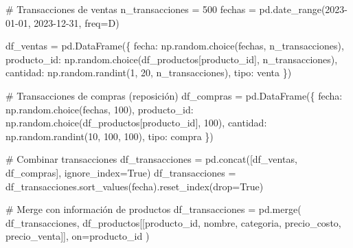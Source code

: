 \documentclass[
  doc,
  floatsintext,
  longtable,
  a4paper,
  nolmodern,
  notxfonts,
  notimes,
  12pt,
  colorlinks=true,linkcolor=blue,citecolor=blue,urlcolor=blue]{apa7}
\newenvironment{Shaded}{\begin{snugshade}}{\end{snugshade}}
\newcommand{\CommentTok}[1]{\textcolor[rgb]{0.37,0.37,0.37}{#1}}
\newcommand{\DecValTok}[1]{\textcolor[rgb]{0.68,0.00,0.00}{#1}}
\newcommand{\NormalTok}[1]{\textcolor[rgb]{0.00,0.23,0.31}{#1}}
\newcommand{\OperatorTok}[1]{\textcolor[rgb]{0.37,0.37,0.37}{#1}}
\newcommand{\StringTok}[1]{\textcolor[rgb]{0.13,0.47,0.30}{#1}}
\newcommand{\VariableTok}[1]{\textcolor[rgb]{0.07,0.07,0.07}{#1}}
\begin{document}
\begin{Shaded}
\begin{Highlighting}[]
\CommentTok{\# Transacciones de ventas}
\NormalTok{n\_transacciones }\OperatorTok{=} \DecValTok{500}
\NormalTok{fechas }\OperatorTok{=}\NormalTok{ pd.date\_range(}\StringTok{\textquotesingle{}2023{-}01{-}01\textquotesingle{}}\NormalTok{, }\StringTok{\textquotesingle{}2023{-}12{-}31\textquotesingle{}}\NormalTok{, freq}\OperatorTok{=}\StringTok{\textquotesingle{}D\textquotesingle{}}\NormalTok{)}

\NormalTok{df\_ventas }\OperatorTok{=}\NormalTok{ pd.DataFrame(\{}
    \StringTok{\textquotesingle{}fecha\textquotesingle{}}\NormalTok{: np.random.choice(fechas, n\_transacciones),}
    \StringTok{\textquotesingle{}producto\_id\textquotesingle{}}\NormalTok{: np.random.choice(df\_productos[}\StringTok{\textquotesingle{}producto\_id\textquotesingle{}}\NormalTok{], n\_transacciones),}
    \StringTok{\textquotesingle{}cantidad\textquotesingle{}}\NormalTok{: np.random.randint(}\DecValTok{1}\NormalTok{, }\DecValTok{20}\NormalTok{, n\_transacciones),}
    \StringTok{\textquotesingle{}tipo\textquotesingle{}}\NormalTok{: }\StringTok{\textquotesingle{}venta\textquotesingle{}}
\NormalTok{\})}

\CommentTok{\# Transacciones de compras (reposición)}
\NormalTok{df\_compras }\OperatorTok{=}\NormalTok{ pd.DataFrame(\{}
    \StringTok{\textquotesingle{}fecha\textquotesingle{}}\NormalTok{: np.random.choice(fechas, }\DecValTok{100}\NormalTok{),}
    \StringTok{\textquotesingle{}producto\_id\textquotesingle{}}\NormalTok{: np.random.choice(df\_productos[}\StringTok{\textquotesingle{}producto\_id\textquotesingle{}}\NormalTok{], }\DecValTok{100}\NormalTok{),}
    \StringTok{\textquotesingle{}cantidad\textquotesingle{}}\NormalTok{: np.random.randint(}\DecValTok{10}\NormalTok{, }\DecValTok{100}\NormalTok{, }\DecValTok{100}\NormalTok{),}
    \StringTok{\textquotesingle{}tipo\textquotesingle{}}\NormalTok{: }\StringTok{\textquotesingle{}compra\textquotesingle{}}
\NormalTok{\})}

\CommentTok{\# Combinar transacciones}
\NormalTok{df\_transacciones }\OperatorTok{=}\NormalTok{ pd.concat([df\_ventas, df\_compras], ignore\_index}\OperatorTok{=}\VariableTok{True}\NormalTok{)}
\NormalTok{df\_transacciones }\OperatorTok{=}\NormalTok{ df\_transacciones.sort\_values(}\StringTok{\textquotesingle{}fecha\textquotesingle{}}\NormalTok{).reset\_index(drop}\OperatorTok{=}\VariableTok{True}\NormalTok{)}

\CommentTok{\# Merge con información de productos}
\NormalTok{df\_transacciones }\OperatorTok{=}\NormalTok{ pd.merge(}
\NormalTok{    df\_transacciones,}
\NormalTok{    df\_productos[[}\StringTok{\textquotesingle{}producto\_id\textquotesingle{}}\NormalTok{, }\StringTok{\textquotesingle{}nombre\textquotesingle{}}\NormalTok{, }\StringTok{\textquotesingle{}categoria\textquotesingle{}}\NormalTok{, }\StringTok{\textquotesingle{}precio\_costo\textquotesingle{}}\NormalTok{, }\StringTok{\textquotesingle{}precio\_venta\textquotesingle{}}\NormalTok{]],}
\NormalTok{    on}\OperatorTok{=}\StringTok{\textquotesingle{}producto\_id\textquotesingle{}}
\NormalTok{)}


\end{Highlighting}
\end{Shaded}
\end{document}
